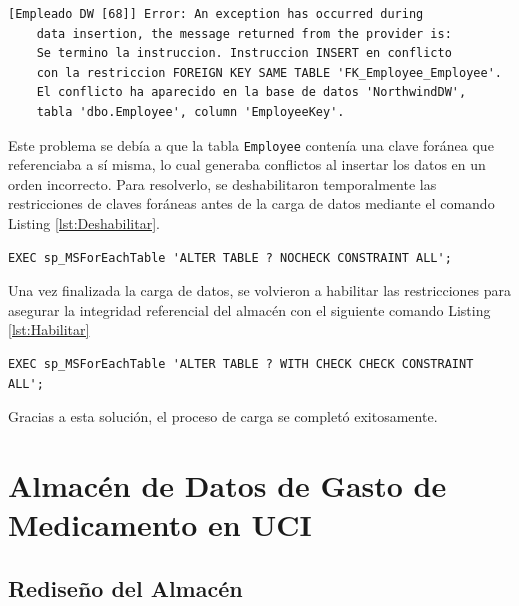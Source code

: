 \documentclass{article}
\begin{document}
	\begin{lstlisting}[style=ddlstyle, label=lst:error,caption=Error al llenar empleado]
	[Empleado DW [68]] Error: An exception has occurred during 
	data insertion, the message returned from the provider is: 
	Se termino la instruccion. Instruccion INSERT en conflicto 
	con la restriccion FOREIGN KEY SAME TABLE 'FK_Employee_Employee'. 
	El conflicto ha aparecido en la base de datos 'NorthwindDW', 
	tabla 'dbo.Employee', column 'EmployeeKey'.
	\end{lstlisting}
	
	Este problema se debía a que la tabla \texttt{Employee} contenía una clave foránea que referenciaba a sí misma, lo cual generaba conflictos al insertar los datos en un orden incorrecto. Para resolverlo, se deshabilitaron temporalmente las restricciones de claves foráneas antes de la carga de datos mediante el comando Listing \ref{lst:Deshabilitar}.
	
	
	\begin{lstlisting}[style=ddlstyle, label=lst:Deshabilitar,caption=Deshabilitar restricciones en empleado]
	EXEC sp_MSForEachTable 'ALTER TABLE ? NOCHECK CONSTRAINT ALL';
	\end{lstlisting}
	
	Una vez finalizada la carga de datos, se volvieron a habilitar las restricciones para asegurar la integridad referencial del almacén con el siguiente comando Listing \ref{lst:Habilitar}
	
	
	\begin{lstlisting}[style=ddlstyle, label=lst:Habilitar,caption=Habilitar restricciones en empleado]
	EXEC sp_MSForEachTable 'ALTER TABLE ? WITH CHECK CHECK CONSTRAINT ALL';
	\end{lstlisting}
	
	Gracias a esta solución, el proceso de carga se completó exitosamente. 
	
	\section{Almacén de Datos de Gasto de Medicamento en UCI}
	
	\subsection{Rediseño del Almacén}
	
\end{document}
